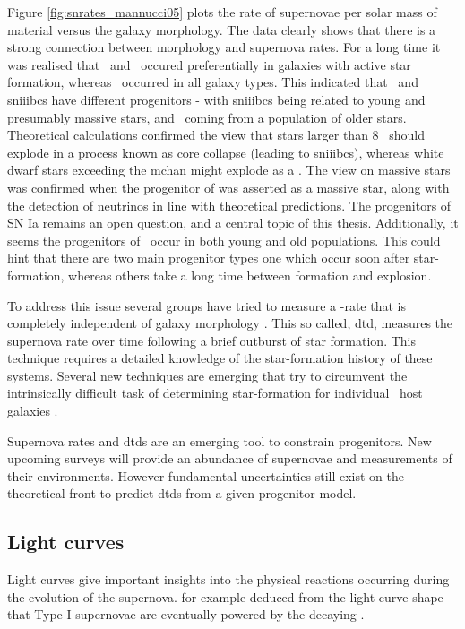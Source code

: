 Figure \ref{fig:snrates_mannucci05} plots the rate of supernovae per solar mass of material versus the galaxy morphology. The data clearly shows that there is a strong connection between morphology and supernova rates. For a long time it was realised that \sneii\ and \sneibc\ occured preferentially in galaxies with active star formation, whereas \sneia\ occurred in all galaxy types. This indicated that \sneia\ and \glspl{sniiibc} have different progenitors - with \glspl{sniiibc} being related to young and presumably massive stars, and \sneia\ coming from a population of older stars. Theoretical calculations confirmed the view that stars larger than 8 \msun\ should explode in a process known as core collapse (leading to \glspl{sniiibc}), whereas white dwarf stars exceeding the \gls{mchan} might explode as a \snia. 
 The view on massive stars was confirmed when the progenitor of  was asserted as a massive star, along with the detection of neutrinos in line with theoretical predictions. The progenitors of SN Ia remains an open question, and a central topic of this thesis. Additionally, it seems the progenitors of \sneia\ occur in both young and old populations. This could hint that there are two main progenitor types one which occur soon after star-formation, whereas others take a long time between formation and explosion. 

To address this issue several groups have tried to measure a \sneia-rate that is completely independent of galaxy morphology \citep[e.g.][]{2006MNRAS.370..773M, 2010ApJ...722.1879M}. This so called, \gls{dtd}, measures the supernova rate over time following a brief outburst of star formation.
This technique requires a detailed knowledge of the star-formation history of these systems. Several new techniques are emerging that try to circumvent the intrinsically difficult task of determining star-formation for individual \sneia\ host galaxies \citep{2010MNRAS.407.1314M, 2010arXiv1010.5786B, 2008PASJ...60.1327T, 2010ApJ...722.1879M}.

Supernova rates and \glspl{dtd} are an emerging tool to constrain progenitors. New upcoming surveys will provide an abundance of supernovae and measurements of their environments.  However fundamental uncertainties still exist on the theoretical front to predict \glspl{dtd} from a given progenitor model.

\subsection{Light curves} 
\label{sec:intro_lc}
Light curves give important insights into the physical reactions occurring during the evolution of the supernova. \cite{1982ApJ...253..785A} for example deduced from the light-curve shape that Type I supernovae are eventually powered by the decaying \Co. 


